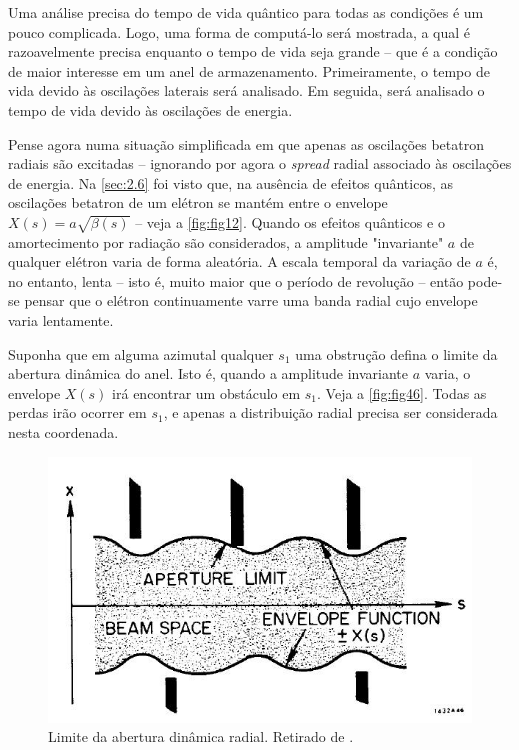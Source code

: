 Uma análise precisa do tempo de vida quântico para todas as condições é um pouco complicada. Logo, uma forma de computá-lo será mostrada, a qual é razoavelmente precisa enquanto o tempo de vida seja grande -- que é a condição de maior interesse em um anel de armazenamento. Primeiramente, o tempo de vida devido às oscilações laterais será analisado. Em seguida, será analisado o tempo de vida devido às oscilações de energia.

Pense agora numa situação simplificada em que apenas as oscilações betatron radiais são excitadas -- ignorando por agora o \textit{spread} radial associado às oscilações de energia.  Na \autoref{sec:2.6} foi visto que, na ausência de efeitos quânticos, as oscilações betatron de um elétron se mantém entre o envelope $X(s) = a\sqrt{\beta(s)}$ -- veja a \autoref{fig:fig12}. Quando os efeitos quânticos e o amortecimento por radiação são considerados, a amplitude "invariante" $a$ de qualquer elétron varia de forma aleatória. A escala temporal da variação de $a$ é, no entanto, lenta -- isto é, muito maior que o período de revolução -- então pode-se pensar que o elétron continuamente varre uma banda radial cujo envelope varia lentamente.

Suponha que em alguma azimutal qualquer $s_1$ uma obstrução defina o limite da abertura dinâmica do anel. Isto é, quando a amplitude invariante $a$ varia, o envelope $X(s)$ irá encontrar um obstáculo em $s_1$. Veja a \autoref{fig:fig46}. Todas as perdas irão ocorrer em $s_1$, e apenas a distribuição radial precisa ser considerada nesta coordenada.

\begin{figure}[!htb]
	\centering
	\includegraphics[width=0.6\linewidth]{./Figuras/fig46.jpeg}
	\caption{Limite da abertura dinâmica radial. Retirado de \cite{sands1970physics}.}
	\label{fig:fig46}
\end{figure}

